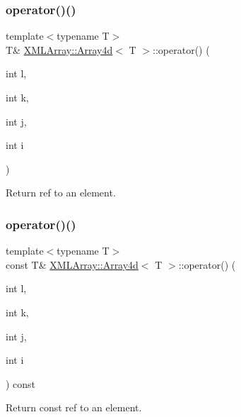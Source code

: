 \subsubsection{\texorpdfstring{operator()()}{operator()()}\hspace{0.1cm}{\footnotesize\ttfamily [3/6]}}
{\footnotesize\ttfamily template$<$typename T$>$ \\
T\& \mbox{\hyperlink{classXMLArray_1_1Array4d}{X\+M\+L\+Array\+::\+Array4d}}$<$ T $>$\+::operator() (\begin{DoxyParamCaption}\item[{int}]{l,  }\item[{int}]{k,  }\item[{int}]{j,  }\item[{int}]{i }\end{DoxyParamCaption})\hspace{0.3cm}{\ttfamily [inline]}}



Return ref to an element. 

\mbox{\label{classXMLArray_1_1Array4d_ae9076800aed9ec98d434d01fcaf4ba3a}} 
\subsubsection{\texorpdfstring{operator()()}{operator()()}\hspace{0.1cm}{\footnotesize\ttfamily [4/6]}}
{\footnotesize\ttfamily template$<$typename T$>$ \\
const T\& \mbox{\hyperlink{classXMLArray_1_1Array4d}{X\+M\+L\+Array\+::\+Array4d}}$<$ T $>$\+::operator() (\begin{DoxyParamCaption}\item[{int}]{l,  }\item[{int}]{k,  }\item[{int}]{j,  }\item[{int}]{i }\end{DoxyParamCaption}) const\hspace{0.3cm}{\ttfamily [inline]}}



Return const ref to an element. 

\mbox{\label{classXMLArray_1_1Array4d_ae9076800aed9ec98d434d01fcaf4ba3a}} 
